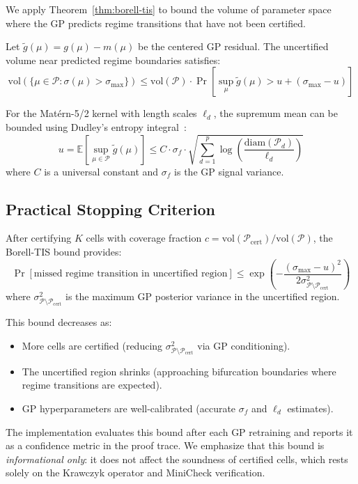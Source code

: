 \documentclass[11pt]{article}
\begin{document}
We apply Theorem~\ref{thm:borell-tis} to bound the volume of parameter space where the GP predicts regime transitions that have not been certified.

Let $\tilde{g}(\mu) = g(\mu) - m(\mu)$ be the centered GP residual.
The uncertified volume near predicted regime boundaries satisfies:
\[
\mathrm{vol}\!\left(\{\mu \in \mathcal{P} : \sigma(\mu) > \sigma_{\max}\}\right) \leq \mathrm{vol}(\mathcal{P}) \cdot \Pr\!\left[\sup_\mu \tilde{g}(\mu) > u + (\sigma_{\max} - u)\right]
\]

For the Mat\'ern-5/2 kernel with length scales $\ell_d$, the supremum mean can be bounded using Dudley's entropy integral~\cite{rasmussen2006}:
\[
u = \mathbb{E}\!\left[\sup_{\mu \in \mathcal{P}} \tilde{g}(\mu)\right] \leq C \cdot \sigma_f \cdot \sqrt{\sum_{d=1}^p \log\!\left(\frac{\mathrm{diam}(\mathcal{P}_d)}{\ell_d}\right)}
\]
where $C$ is a universal constant and $\sigma_f$ is the GP signal variance.

\subsection{Practical Stopping Criterion}

After certifying $K$ cells with coverage fraction $c = \mathrm{vol}(\mathcal{P}_{\mathrm{cert}}) / \mathrm{vol}(\mathcal{P})$, the Borell-TIS bound provides:
\[
\Pr[\text{missed regime transition in uncertified region}] \leq \exp\!\left(-\frac{(\sigma_{\max} - u)^2}{2\sigma_{\mathcal{P} \setminus \mathcal{P}_{\mathrm{cert}}}^2}\right)
\]
where $\sigma_{\mathcal{P} \setminus \mathcal{P}_{\mathrm{cert}}}^2$ is the maximum GP posterior variance in the uncertified region.

This bound decreases as:
\begin{itemize}
\item More cells are certified (reducing $\sigma_{\mathcal{P} \setminus \mathcal{P}_{\mathrm{cert}}}^2$ via GP conditioning).
\item The uncertified region shrinks (approaching bifurcation boundaries where regime transitions are expected).
\item GP hyperparameters are well-calibrated (accurate $\sigma_f$ and $\ell_d$ estimates).
\end{itemize}

The implementation evaluates this bound after each GP retraining and reports it as a confidence metric in the proof trace.
We emphasize that this bound is \emph{informational only}: it does not affect the soundness of certified cells, which rests solely on the Krawczyk operator and MiniCheck verification.
\end{document}
